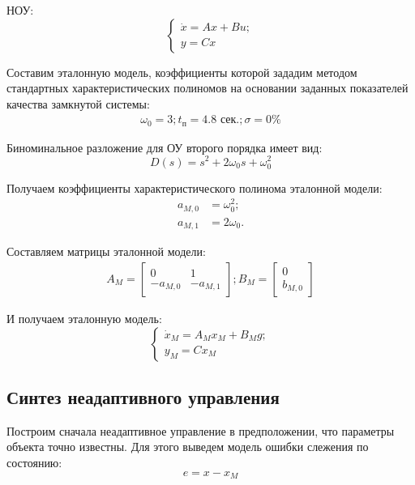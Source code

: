 НОУ:
\begin{equation}
	\begin{cases}
	\dot x = A x + B u;\\
	y = C x
	\end{cases}
\end{equation}



Составим эталонную модель, коэффициенты которой зададим методом стандартных характеристических полиномов на основании заданных показателей качества замкнутой системы:
\begin{align}
	\omega_0 = 3; t_{\text{п}} = 4.8\text{ сек.}; \sigma =  0\%
\end{align}

Биноминальное разложение для ОУ второго порядка имеет вид:
\begin{equation}
	D(s) = s^2 + 2 \omega_0 s + \omega_0^2
\end{equation}

Получаем коэффициенты характеристического полинома эталонной модели:
\begin{align}
	a_{M,0} &= \omega_0^2;\\
	a_{M,1} &= 2 \omega_0.
\end{align}

Составляем матрицы эталонной модели:
\begin{align}
	A_{M} = 
	\begin{bmatrix}
		0 & 1\\
		-a_{M,0} & -a_{M,1}
	\end{bmatrix};
	B_{M} =
	\begin{bmatrix}
		0\\
		b_{M,0}
	\end{bmatrix}
\end{align}

И получаем эталонную модель:
\begin{equation}
	\begin{cases}
		\dot x_{M} = A_{M} x_{M} + B_{M} g;\\
		y_{M} = C x_{M}
	\end{cases}
\end{equation}


\subsection{Синтез неадаптивного управления}

Построим сначала неадаптивное управление в предположении, что параметры объекта точно известны. Для этого выведем модель ошибки слежения по состоянию:
\begin{equation}\label{error}
	e = x - x_{M}
\end{equation}

